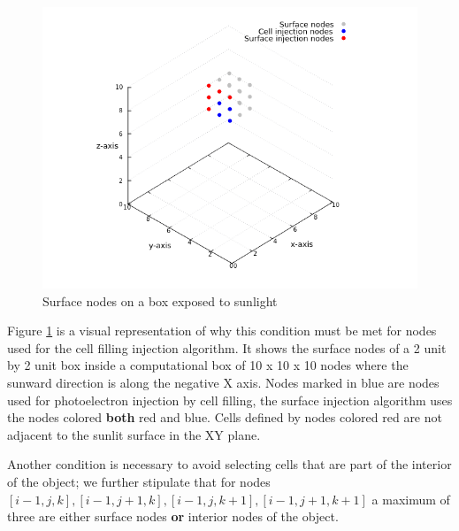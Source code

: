 \begin{figure}[h!]
    \centering
    \includegraphics[scale=0.6]{figures/ReferenceFigures/nodes.png}
    \caption{Surface nodes on a box exposed to sunlight}
    \label{fig:sunlitNodes}
\end{figure}

Figure \ref{fig:sunlitNodes} is a visual representation of why this condition must be met for nodes used for the cell filling injection algorithm. It shows the surface nodes of a 2 unit by 2 unit box inside a computational box of 10 x 10 x 10 nodes where the sunward direction is along the negative X axis. Nodes marked in blue are nodes used for photoelectron injection by cell filling, the surface injection algorithm uses the nodes colored \textbf{both} red and blue. Cells defined by nodes colored red are not adjacent to the sunlit surface in the XY plane.

Another condition is necessary to avoid selecting cells that are part of the interior of the object; we further stipulate that for nodes $[i-1,j,k], [i-1,j+1,k], [i-1,j,k+1], [i-1,j+1,k+1]$ a maximum of three are either surface nodes \textbf{or} interior nodes of the object.


